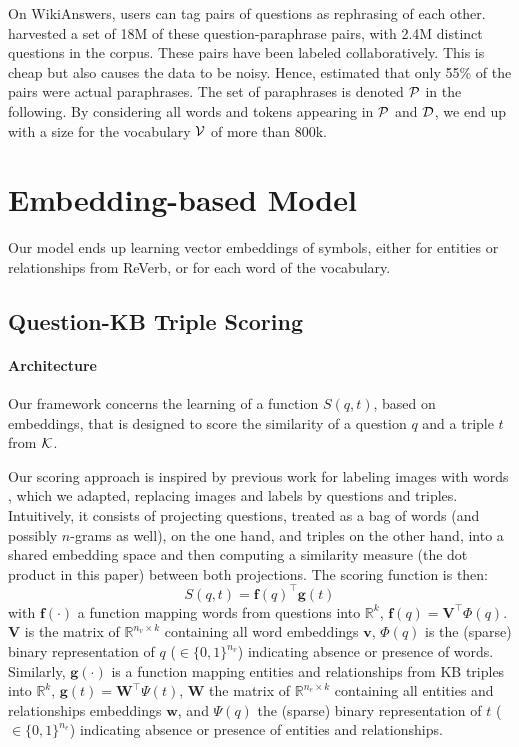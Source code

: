 \documentclass[runningheads,a4paper]{llncs}
\renewcommand{\Re}{\mathbb{R}}
\newcommand{\bbw}{\boldsymbol{w}}
\newcommand{\bbW}{\boldsymbol{W}}
\newcommand{\bbv}{\boldsymbol{v}}
\newcommand{\bbV}{\boldsymbol{V}}
\newcommand{\bbg}{\boldsymbol{g}}
\newcommand{\bbf}{\boldsymbol{f}}
\newcommand{\rv}{{\sc ReVerb}\xspace}
\newcommand{\wk}{{\sc WikiAnswers}\xspace}
\begin{document}
On \wk, users can tag pairs of questions as rephrasing of each other.
\cite{paralex} harvested a set of 18M of these question-paraphrase pairs, with 2.4M distinct questions in the corpus. These pairs have been labeled collaboratively. This is cheap but also causes the data to be noisy.
Hence, \cite{paralex} estimated that only 55\% of the pairs were actual paraphrases.
The set of paraphrases is denoted ${\cal P}$ in the following.
By considering all words and tokens appearing in ${\cal P}$ and ${\cal D}$, we end up with a size for the vocabulary ${\cal V}$ of more than 800k.









\section{Embedding-based Model}
\label{sec:model}

Our model ends up learning vector embeddings of symbols, either for  entities or relationships from \rv, or for each word of the vocabulary. 



\subsection{Question-KB Triple Scoring}

\paragraph{Architecture}
Our framework concerns the learning of a function $S(q, t)$, based on embeddings, 
that is designed to score the similarity of a question $q$  and a triple $t$ from ${\cal K}$. 

Our scoring approach is inspired by previous work for labeling images with words \cite{wsabie},
which we adapted, replacing images and labels by questions and triples.
Intuitively, it consists of projecting questions, treated as a bag of words (and possibly $n$-grams as well), on the one hand, and triples on the other hand, into a shared embedding space and then computing a similarity measure (the dot product in this paper) between both projections.
The scoring function is then:
$$
S(q,t) = \bbf(q)^\top \bbg(t)
$$
with $\bbf(\cdot)$ a function mapping words from questions into $\Re^k$, $\bbf(q) = \bbV^\top\Phi(q)$. $\bbV$ is the matrix of $\Re^{n_v\times k}$ containing all word embeddings $\bbv$, $\Phi(q)$ is the (sparse)
binary representation of $q$ ($\in \{0,1\}^{n_v}$) indicating absence or presence of words.
Similarly, $\bbg(\cdot)$ is a function mapping entities and relationships from KB triples into $\Re^k$, $\bbg(t) = \bbW^\top\Psi(t)$, $\bbW$ the matrix of $\Re^{n_e\times k}$ containing all entities and relationships embeddings $\bbw$, and $\Psi(q)$ the (sparse)
binary representation of $t$ ($\in \{0,1\}^{n_e}$) indicating absence or presence of entities and relationships.
\end{document}
